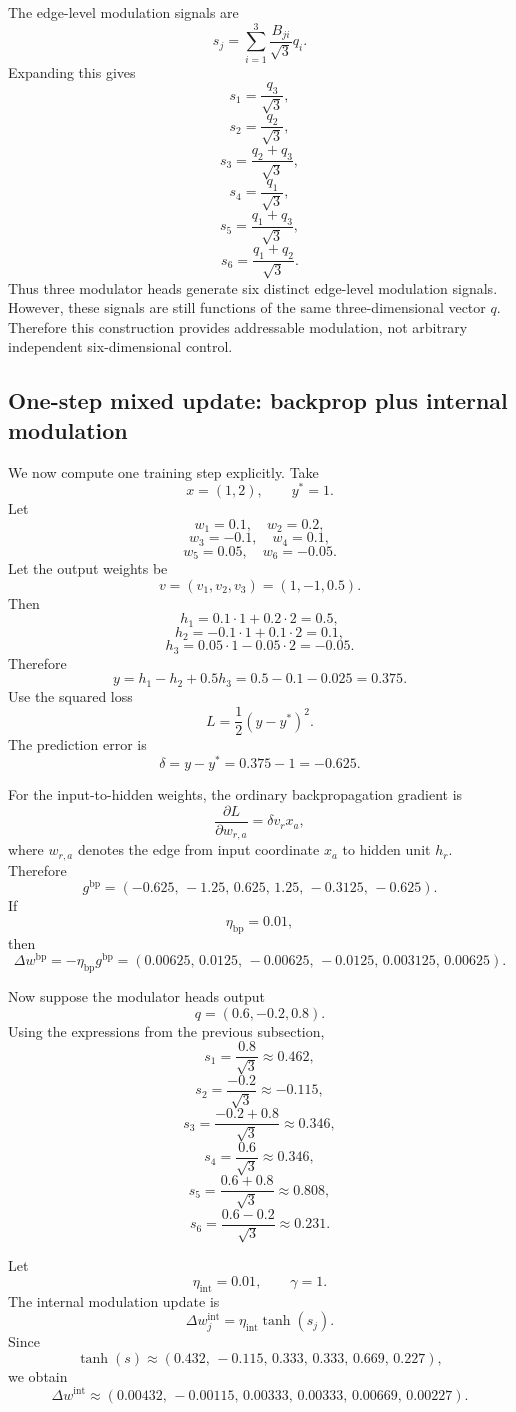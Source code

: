 \documentclass[11pt]{article}
\newcommand{\1}{\mathbf{1}}
\begin{document}
The edge-level modulation signals are
\[
s_j=\sum_{i=1}^3\frac{B_{ji}}{\sqrt{3}}q_i.
\]
Expanding this gives
\[
s_1=\frac{q_3}{\sqrt3},
\]
\[
s_2=\frac{q_2}{\sqrt3},
\]
\[
s_3=\frac{q_2+q_3}{\sqrt3},
\]
\[
s_4=\frac{q_1}{\sqrt3},
\]
\[
s_5=\frac{q_1+q_3}{\sqrt3},
\]
\[
s_6=\frac{q_1+q_2}{\sqrt3}.
\]
Thus three modulator heads generate six distinct edge-level modulation signals. However, these signals are still functions of the same three-dimensional vector \(q\). Therefore this construction provides addressable modulation, not arbitrary independent six-dimensional control.

\subsection{One-step mixed update: backprop plus internal modulation}

We now compute one training step explicitly. Take
\[
x=(1,2),
\qquad
y^\ast=1.
\]
Let
\[
w_1=0.1,\quad w_2=0.2,
\]
\[
w_3=-0.1,\quad w_4=0.1,
\]
\[
w_5=0.05,\quad w_6=-0.05.
\]
Let the output weights be
\[
v=(v_1,v_2,v_3)=(1,-1,0.5).
\]
Then
\[
h_1=0.1\cdot 1+0.2\cdot 2=0.5,
\]
\[
h_2=-0.1\cdot 1+0.1\cdot 2=0.1,
\]
\[
h_3=0.05\cdot 1-0.05\cdot 2=-0.05.
\]
Therefore
\[
y=h_1-h_2+0.5h_3
=
0.5-0.1-0.025
=
0.375.
\]
Use the squared loss
\[
L=\frac12(y-y^\ast)^2.
\]
The prediction error is
\[
\delta=y-y^\ast=0.375-1=-0.625.
\]

For the input-to-hidden weights, the ordinary backpropagation gradient is
\[
\frac{\partial L}{\partial w_{r,a}}
=
\delta v_r x_a,
\]
where \(w_{r,a}\) denotes the edge from input coordinate \(x_a\) to hidden unit \(h_r\). Therefore
\[
g^{\mathrm{bp}}
=
\left(
-0.625,\,
-1.25,\,
0.625,\,
1.25,\,
-0.3125,\,
-0.625
\right).
\]
If
\[
\eta_{\mathrm{bp}}=0.01,
\]
then
\[
\Delta w^{\mathrm{bp}}
=
-\eta_{\mathrm{bp}}g^{\mathrm{bp}}
=
\left(
0.00625,\,
0.0125,\,
-0.00625,\,
-0.0125,\,
0.003125,\,
0.00625
\right).
\]

Now suppose the modulator heads output
\[
q=(0.6,-0.2,0.8).
\]
Using the expressions from the previous subsection,
\[
s_1=\frac{0.8}{\sqrt3}\approx0.462,
\]
\[
s_2=\frac{-0.2}{\sqrt3}\approx-0.115,
\]
\[
s_3=\frac{-0.2+0.8}{\sqrt3}\approx0.346,
\]
\[
s_4=\frac{0.6}{\sqrt3}\approx0.346,
\]
\[
s_5=\frac{0.6+0.8}{\sqrt3}\approx0.808,
\]
\[
s_6=\frac{0.6-0.2}{\sqrt3}\approx0.231.
\]

Let
\[
\eta_{\mathrm{int}}=0.01,
\qquad
\gamma=1.
\]
The internal modulation update is
\[
\Delta w_j^{\mathrm{int}}
=
\eta_{\mathrm{int}}\tanh(s_j).
\]
Since
\[
\tanh(s)
\approx
(0.432,\,-0.115,\,0.333,\,0.333,\,0.669,\,0.227),
\]
we obtain
\[
\Delta w^{\mathrm{int}}
\approx
\left(
0.00432,\,
-0.00115,\,
0.00333,\,
0.00333,\,
0.00669,\,
0.00227
\right).
\]
\end{document}
